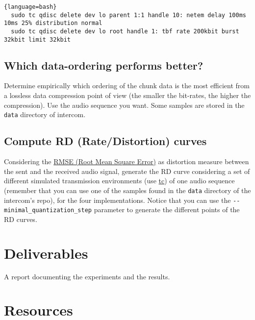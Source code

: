 \begin{lstlisting}{language=bash}
  sudo tc qdisc delete dev lo parent 1:1 handle 10: netem delay 100ms 10ms 25% distribution normal
  sudo tc qdisc delete dev lo root handle 1: tbf rate 200kbit burst 32kbit limit 32kbit
\end{lstlisting}

\subsection{Which data-ordering performs better?}
Determine empirically which ordering of the chunk data is the most
efficient from a lossless data compression point of view (the smaller
the bit-rates, the higher the compression). Use the audio sequence you
want. Some samples are stored in the \verb|data| directory of
intercom.

\subsection{Compute RD (Rate/Distortion) curves}
Considering the
\href{https://en.wikipedia.org/wiki/Root-mean-square_deviation}{RMSE
  (Root Mean Square Error)} as distortion measure between the sent and
the received audio signal, generate the RD curve considering a set of
different simulated transmission environments (use
\href{https://man7.org/linux/man-pages/man8/tc.8.html}{tc}) of one
audio sequence (remember that you can use one of the samples found in
the \verb|data| directory of the intercom's repo), for the four
implementations. Notice that you can use the
\verb|--minimal_quantization_step| parameter to generate the different
points of the RD curves.


\section{Deliverables}

A report documenting the experiments and the results.

\section{Resources}


